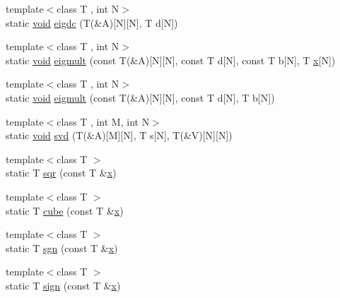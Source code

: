 \begin{DoxyCompactItemize}
\item 
{\footnotesize template$<$class T , int N$>$ }\\static \hyperlink{namespacetrimesh_a784ddfd979e1c579bda795a8edfc3f43}{void} \hyperlink{namespacetrimesh_ab851c84d883d49aebb9261472b9cfc89}{eigdc} (T(\&A)\mbox{[}N\mbox{]}\mbox{[}N\mbox{]}, T d\mbox{[}N\mbox{]})
\item 
{\footnotesize template$<$class T , int N$>$ }\\static \hyperlink{namespacetrimesh_a784ddfd979e1c579bda795a8edfc3f43}{void} \hyperlink{namespacetrimesh_a6d938829940c50c8b40dcd35a4e45a5a}{eigmult} (const T(\&A)\mbox{[}N\mbox{]}\mbox{[}N\mbox{]}, const T d\mbox{[}N\mbox{]}, const T b\mbox{[}N\mbox{]}, T \hyperlink{namespacetrimesh_a3365d1b1a1bc5d8e9c844cf589a8c4a8}{x}\mbox{[}N\mbox{]})
\item 
{\footnotesize template$<$class T , int N$>$ }\\static \hyperlink{namespacetrimesh_a784ddfd979e1c579bda795a8edfc3f43}{void} \hyperlink{namespacetrimesh_a166e0e76af0db363be9afa67f378a08f}{eigmult} (const T(\&A)\mbox{[}N\mbox{]}\mbox{[}N\mbox{]}, const T d\mbox{[}N\mbox{]}, T b\mbox{[}N\mbox{]})
\item 
{\footnotesize template$<$class T , int M, int N$>$ }\\static \hyperlink{namespacetrimesh_a784ddfd979e1c579bda795a8edfc3f43}{void} \hyperlink{namespacetrimesh_a6adde694d3ce031af879d34eab9c07db}{svd} (T(\&A)\mbox{[}M\mbox{]}\mbox{[}N\mbox{]}, T s\mbox{[}N\mbox{]}, T(\&V)\mbox{[}N\mbox{]}\mbox{[}N\mbox{]})
\item 
{\footnotesize template$<$class T $>$ }\\static T \hyperlink{namespacetrimesh_a51b76a98ab947ef387705b2c10b1c090}{sqr} (const T \&\hyperlink{namespacetrimesh_a3365d1b1a1bc5d8e9c844cf589a8c4a8}{x})
\item 
{\footnotesize template$<$class T $>$ }\\static T \hyperlink{namespacetrimesh_ab10142c482d70b93786d10a1fe716690}{cube} (const T \&\hyperlink{namespacetrimesh_a3365d1b1a1bc5d8e9c844cf589a8c4a8}{x})
\item 
{\footnotesize template$<$class T $>$ }\\static T \hyperlink{namespacetrimesh_a3af22a58e26c43a0604eed7184911832}{sgn} (const T \&\hyperlink{namespacetrimesh_a3365d1b1a1bc5d8e9c844cf589a8c4a8}{x})
\item 
{\footnotesize template$<$class T $>$ }\\static T \hyperlink{namespacetrimesh_a734917113fc3e54c3327d91ad0ea88c3}{sign} (const T \&\hyperlink{namespacetrimesh_a3365d1b1a1bc5d8e9c844cf589a8c4a8}{x})

\end{DoxyCompactItemize}
